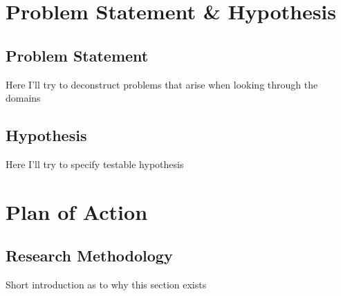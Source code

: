 \documentclass[signatures]{Thesis}
\begin{document}




\tableofcontents
\newpage



\chapter{Problem Statement \& Hypothesis}
\section{Problem Statement}
  	Here I'll try to deconstruct problems that arise when looking through the domains
  \section{Hypothesis}
  	Here I'll try to specify testable hypothesis



\chapter{Plan of Action}
  	\section{Research Methodology}
  	Short introduction as to why this section exists
  	
\end{document}
